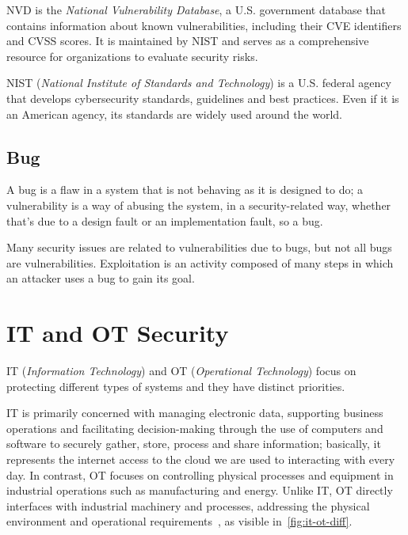 
NVD is the \textit{National Vulnerability Database}, a U.S. government database that contains information about known vulnerabilities, including their CVE identifiers and CVSS scores. It is maintained by NIST and serves as a comprehensive resource for organizations to evaluate security risks.

NIST (\textit{National Institute of Standards and Technology}) is a U.S. federal agency that develops cybersecurity standards, guidelines and best practices. Even if it is an American agency, its standards are widely used around the world.

\subsection{Bug}

A bug is a flaw in a system that is not behaving as it is designed to do; a vulnerability is a way of abusing the system, in a security-related way, whether that's due to a design fault or an implementation fault, so a bug.

Many security issues are related to vulnerabilities due to bugs, but not all bugs are vulnerabilities. Exploitation is an activity composed of many steps in which an attacker uses a bug to gain its goal.

\section{IT and OT Security}

IT (\textit{Information Technology}) and OT (\textit{Operational Technology}) focus on protecting different types of systems and they have distinct priorities.

IT is primarily concerned with managing electronic data, supporting business operations and facilitating decision-making through the use of computers and software to securely gather, store, process and share information; basically, it represents the internet access to the cloud we are used to interacting with every day. In contrast, OT focuses on controlling physical processes and equipment in industrial operations such as manufacturing and energy. Unlike IT, OT directly interfaces with industrial machinery and processes, addressing the physical environment and operational requirements~\cite{it-ot-diff-paloalto}, as visible in~\cref{fig:it-ot-diff}.

